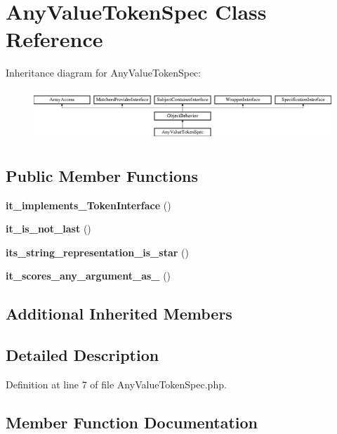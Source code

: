 \section{Any\+Value\+Token\+Spec Class Reference}
\label{classspec_1_1_prophecy_1_1_argument_1_1_token_1_1_any_value_token_spec}
Inheritance diagram for Any\+Value\+Token\+Spec\+:\begin{figure}[H]
\begin{center}
\leavevmode
\includegraphics[height=1.953488cm]{classspec_1_1_prophecy_1_1_argument_1_1_token_1_1_any_value_token_spec}
\end{center}
\end{figure}
\subsection*{Public Member Functions}
\begin{DoxyCompactItemize}
\item 
{\bf it\+\_\+implements\+\_\+\+Token\+Interface} ()
\item 
{\bf it\+\_\+is\+\_\+not\+\_\+last} ()
\item 
{\bf its\+\_\+string\+\_\+representation\+\_\+is\+\_\+star} ()
\item 
{\bf it\+\_\+scores\+\_\+any\+\_\+argument\+\_\+as\+\_} ()
\end{DoxyCompactItemize}
\subsection*{Additional Inherited Members}


\subsection{Detailed Description}


Definition at line 7 of file Any\+Value\+Token\+Spec.\+php.



\subsection{Member Function Documentation}
